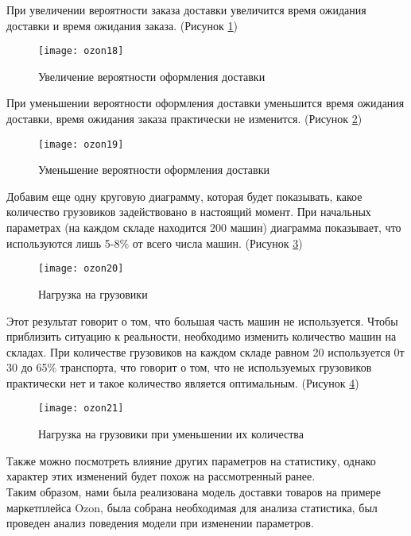 При увеличении вероятности заказа доставки увеличится время ожидания доставки и время ожидания заказа. (Рисунок \ref{fig:ozon18})

\newpage

\begin{figure}[h]
	\centering \texttt{[image: ozon18]}
	\caption{Увеличение вероятности оформления доставки}
	\label{fig:ozon18}
\end{figure}

При уменьшении вероятности оформления доставки уменьшится время ожидания доставки, время ожидания заказа практически не изменится. (Рисунок \ref{fig:ozon19})

\begin{figure}[h]
	\centering \texttt{[image: ozon19]}
	\caption{Уменьшение вероятности оформления доставки}
	\label{fig:ozon19}
\end{figure}

Добавим еще одну круговую диаграмму, которая будет показывать, какое количество грузовиков задействовано в настоящий момент. При начальных параметрах (на каждом складе находится 200 машин) диаграмма показывает, что используются лишь 5-8\% от всего числа машин. (Рисунок \ref{fig:ozon20})

\newpage

\begin{figure}[h]
	\centering \texttt{[image: ozon20]}
	\caption{Нагрузка на грузовики}
	\label{fig:ozon20}
\end{figure}

Этот результат говорит о том, что большая часть машин не используется. Чтобы приблизить ситуацию к реальности, необходимо изменить количество машин на складах. При количестве грузовиков на каждом складе равном 20 используется 0т 30 до 65\% транспорта, что говорит о том, что не используемых грузовиков практически нет и такое количество является оптимальным. (Рисунок \ref{fig:ozon21})

\begin{figure}[h]
	\centering \texttt{[image: ozon21]}
	\caption{Нагрузка на грузовики при уменьшении их количества}
	\label{fig:ozon21}
\end{figure}

Также можно посмотреть влияние других параметров на статистику, однако характер этих изменений будет похож на рассмотренный ранее.\\

Таким образом, нами была реализована модель доставки товаров на примере маркетплейса Ozon, была собрана необходимая для анализа статистика, был проведен анализ поведения модели при изменении параметров.\\